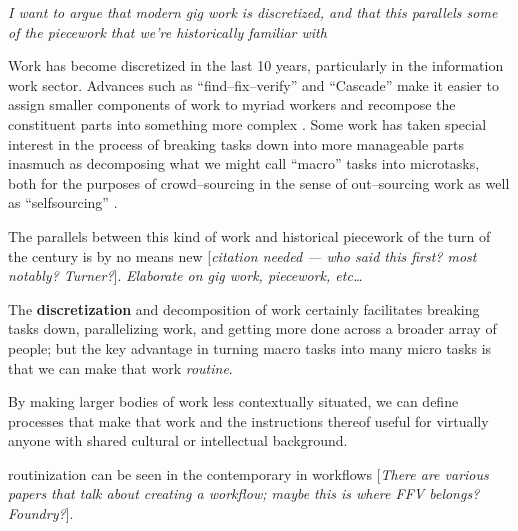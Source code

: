 \documentclass{sigchi}
\begin{document}


\textit{I want to argue that modern gig work is discretized,
and that this parallels some of the piecework that we're historically familiar with}

Work has become discretized in the last 10 years, particularly in the information work sector.
Advances such as
``find--fix--verify'' %
and
``Cascade'' %
make it easier to assign smaller components of work to myriad workers and
recompose the constituent parts into something more complex
\cite{bernstein2015soylent,chilton2013cascade}.
Some work has taken special interest in the process of breaking tasks down into more manageable parts
inasmuch as decomposing what we might call ``macro'' tasks into microtasks,
both for the purposes of crowd--sourcing in the sense of out--sourcing work
as well as ``selfsourcing''
\cite{cheng2015break,teevan2014selfsourcing}.

The parallels between this kind of work and
historical piecework of the turn of the  century
is by no means new
[\textit{citation needed --- who said this first? most notably? Turner?}].
\textit{Elaborate on gig work, piecework, etc\dots}

The \textbf{discretization} and decomposition of work certainly facilitates
breaking tasks down,
parallelizing work,
and getting more done across a broader array of people;
but the key advantage in turning macro tasks 
into many micro tasks is that we can make that work \textit{routine}.

By making larger bodies of work less contextually situated,
we can define processes that make that work
and the instructions thereof
useful for virtually anyone with shared cultural or intellectual background.

routinization can be seen in the contemporary in workflows
\cite{foundry,bernstein2015soylent}
[\textit{There are various papers that talk about creating a workflow;
maybe this is where FFV belongs? Foundry?}].
\end{document}
